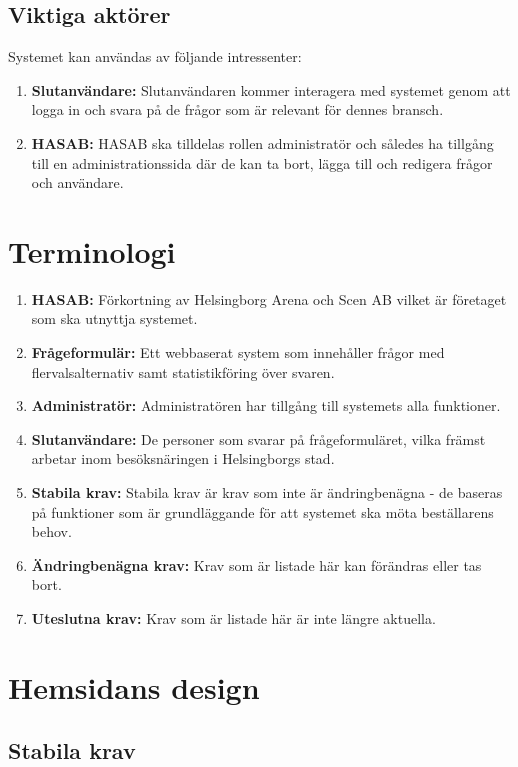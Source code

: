 \documentclass{article}
\begin{document}
    \subsection{Viktiga aktörer}
    Systemet kan användas av följande intressenter:
    \begin{enumerate}
        \item \textbf{Slutanvändare:} Slutanvändaren kommer interagera med systemet genom att logga in och svara på de frågor som är relevant för dennes bransch.
        \item \textbf{HASAB:} HASAB ska tilldelas rollen administratör och således ha tillgång till en administrationssida där de kan ta bort, lägga till och redigera frågor och användare.
    \end{enumerate}
    
    \section{Terminologi}
    \begin{enumerate}
        \item \textbf{HASAB:} Förkortning av Helsingborg Arena och Scen AB vilket är företaget som ska utnyttja systemet.
        \item \textbf{Frågeformulär:} Ett webbaserat system som innehåller frågor med flervalsalternativ samt statistikföring över svaren.
        \item \textbf{Administratör:} Administratören har tillgång till systemets alla funktioner.
        \item \textbf{Slutanvändare:}  De personer som svarar på frågeformuläret, vilka främst arbetar inom besöksnäringen i Helsingborgs stad. 
        \item\textbf{Stabila krav:}  Stabila krav är krav som inte är ändringbenägna - de baseras på funktioner som är grundläggande för att systemet ska möta beställarens behov.
        \item \textbf{Ändringbenägna krav:}  Krav som är listade här kan förändras eller tas bort.
        \item \textbf{Uteslutna krav:}  Krav som är listade här är inte längre aktuella.
    \end{enumerate}
    
    \section{Hemsidans design}
    
    \subsection{Stabila krav}
\end{document}
